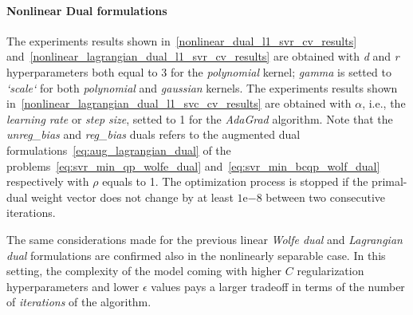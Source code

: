 \paragraph{Nonlinear Dual formulations}

The experiments results shown in~\ref{nonlinear_dual_l1_svr_cv_results} and~\ref{nonlinear_lagrangian_dual_l1_svr_cv_results} are obtained with \emph{d} and \emph{r} hyperparameters both equal to 3 for the \emph{polynomial} kernel; \emph{gamma} is setted to \emph{`scale`} for both \emph{polynomial} and \emph{gaussian} kernels. The experiments results shown in~\ref{nonlinear_lagrangian_dual_l1_svc_cv_results} are obtained with $\alpha$, i.e., the \emph{learning rate} or \emph{step size}, setted to 1 for the \emph{AdaGrad} algorithm. Note that the \emph{unreg\_bias} and \emph{reg\_bias} duals refers to the augmented dual formulations~\eqref{eq:aug_lagrangian_dual} of the problems~\eqref{eq:svr_min_qp_wolfe_dual} and~\eqref{eq:svr_min_bcqp_wolf_dual} respectively with $\rho$ equals to 1. The optimization process is stopped if the primal-dual weight vector does not change by at least $1\mathrm{e}{-8}$  between two consecutive iterations.





The same considerations made for the previous linear \emph{Wolfe dual} and \emph{Lagrangian dual} formulations are confirmed also in the nonlinearly separable case. In this setting, the complexity of the model coming with higher $C$ regularization hyperparameters and lower $\epsilon$ values pays a larger tradeoff in terms of the number of \emph{iterations} of the algorithm.

